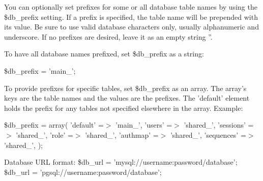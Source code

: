 You can optionally set prefixes for some or all database table names by using the \$db\_\-prefix setting. If a prefix is specified, the table name will be prepended with its value. Be sure to use valid database characters only, usually alphanumeric and underscore. If no prefixes are desired, leave it as an empty string ''.

To have all database names prefixed, set \$db\_\-prefix as a string:

\$db\_\-prefix = 'main\_\-';

To provide prefixes for specific tables, set \$db\_\-prefix as an array. The array's keys are the table names and the values are the prefixes. The 'default' element holds the prefix for any tables not specified elsewhere in the array. Example:

\$db\_\-prefix = array( 'default' =$>$ 'main\_\-', 'users' =$>$ 'shared\_\-', 'sessions' =$>$ 'shared\_\-', 'role' =$>$ 'shared\_\-', 'authmap' =$>$ 'shared\_\-', 'sequences' =$>$ 'shared\_\-', );

Database URL format: \$db\_\-url = 'mysql://username:password/database'; \$db\_\-url = 'pgsql://username:password/database'; 